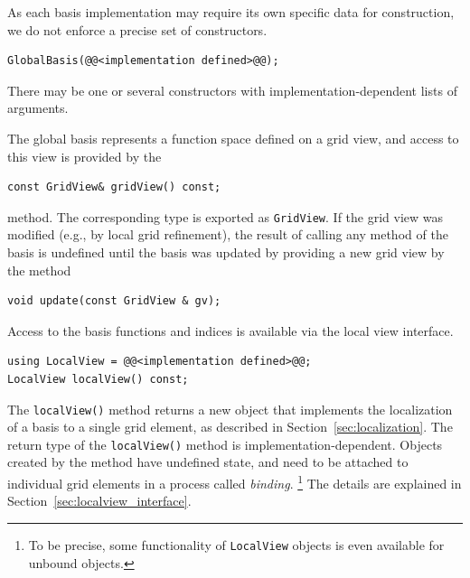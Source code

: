 \documentclass[a4paper,10pt,headings=normal,bibliography=totoc]{scrartcl}
\newcommand{\cpp}[1]{\lstinline[basicstyle=\ttfamily]!#1!}
\begin{document}
As each basis implementation may require its own specific data for construction,
we do not enforce a precise set of constructors.
\begin{lstlisting}[style=Interface]
GlobalBasis(@@<implementation defined>@@);
\end{lstlisting}
There may be one or several constructors with implementation-dependent lists of arguments.

The global basis represents a function space defined on a grid view, and access to
this view is provided by the
\begin{lstlisting}[style=Interface]
const GridView& gridView() const;
\end{lstlisting}
method. The corresponding type
is exported as \cpp{GridView}. If the grid view
was modified (e.g., by local grid refinement), the result of calling any
method of the basis is undefined until the basis was updated by
providing a new grid view by the method
\begin{lstlisting}[style=Interface]
void update(const GridView & gv);
\end{lstlisting}

Access to the basis functions and indices is available via the
local view interface.
\begin{lstlisting}[style=Interface]
using LocalView = @@<implementation defined>@@;
LocalView localView() const;
\end{lstlisting}
The \cpp{localView()} method returns a new object that implements the
localization of a basis to a single grid element, as described in Section~\ref{sec:localization}.
The return type of the \cpp{localView()} method is implementation-dependent. Objects
created by the method have undefined state, and need to be attached to individual grid
elements in a process called \emph{binding}.%
%
\footnote{To be precise, some functionality of \cpp{LocalView} objects is
  even available for unbound objects.}
%
The details are explained in Section~\ref{sec:localview_interface}.
\end{document}
